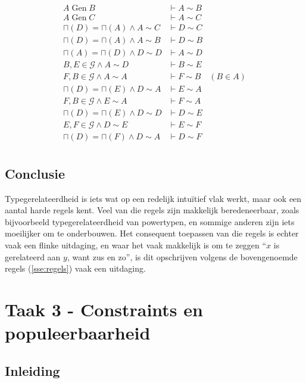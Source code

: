 \documentclass[10pt]{article}
\begin{document}
\begin{align*}
  A \operatorname{Gen} B                 & \vdash A \sim B &           \\
  A \operatorname{Gen} C                 & \vdash A \sim C &           \\
  \sqcap(D) = \sqcap(A) \wedge A \sim C  & \vdash D \sim C &           \\
  \sqcap(D) = \sqcap(A) \wedge A \sim B  & \vdash D \sim B &           \\
  \sqcap(A) = \sqcap(D) \wedge D \sim D  & \vdash A \sim D &           \\
  B, E \in \mathcal{G} \wedge A \sim D   & \vdash B \sim E &           \\
  F, B \in \mathcal{G} \wedge A \sim A   & \vdash F \sim B & (B \in A) \\
  \sqcap(D) = \sqcap (E) \wedge D \sim A & \vdash E \sim A &  \\
  F, B \in \mathcal{G} \wedge E \sim A   & \vdash F \sim A &  \\
  \sqcap(D) = \sqcap(E) \wedge D \sim D  & \vdash D \sim E &  \\
  E, F \in \mathcal{G} \wedge D \sim E   & \vdash E \sim F &  \\
  \sqcap(D) = \sqcap(F) \wedge D \sim A  & \vdash D \sim F & \\
\end{align*}

\subsection{Conclusie}

Typegerelateerdheid is iets wat op een redelijk intu\"itief vlak werkt,
maar ook een aantal harde regels kent. Veel van die regels zijn makkelijk
beredeneerbaar, zoals bijvoorbeeld typegerelateerdheid van powertypen, en 
sommige anderen zijn iets moeilijker om te onderbouwen. Het consequent toepassen
van die regels is echter vaak een flinke uitdaging, en waar het vaak makkelijk is
om te zeggen ``$x$ is gerelateerd aan $y$, want zus en zo'', is dit opschrijven
volgens de bovengenoemde regels (\ref{sse:regels}) vaak een uitdaging.

\section{Taak 3 - Constraints en populeerbaarheid}

\subsection{Inleiding}
\end{document}
